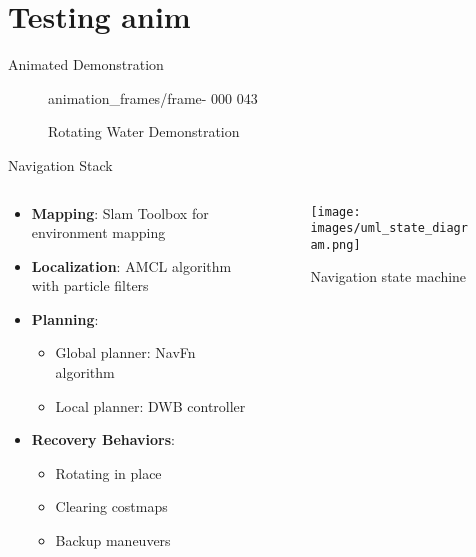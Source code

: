 \documentclass[aspectratio=169]{beamer}
\begin{document}
\section{Testing anim}

\begin{frame}{Animated Demonstration}
	\begin{figure}
		\centering
		{animation_frames/frame-}  %
		{000}                %
		{043}               %
		\caption{Rotating Water Demonstration}
	\end{figure}
\end{frame}


\begin{frame}{Navigation Stack}
	\begin{columns}
		\begin{column}{0.6\textwidth}
			\begin{itemize}
				\item \textbf{Mapping}: Slam Toolbox for environment mapping
				\item \textbf{Localization}: AMCL algorithm with particle filters
				\item \textbf{Planning}:
				      \begin{itemize}
					      \item Global planner: NavFn algorithm
					      \item Local planner: DWB controller
				      \end{itemize}
				\item \textbf{Recovery Behaviors}:
				      \begin{itemize}
					      \item Rotating in place
					      \item Clearing costmaps
					      \item Backup maneuvers
				      \end{itemize}
			\end{itemize}
		\end{column}
		\begin{column}{0.4\textwidth}
			\begin{figure}
				\texttt{[image: images/uml\_state\_diagram.png]}
				\caption{Navigation state machine}
			\end{figure}
		\end{column}
	\end{columns}
\end{frame}
\end{document}
